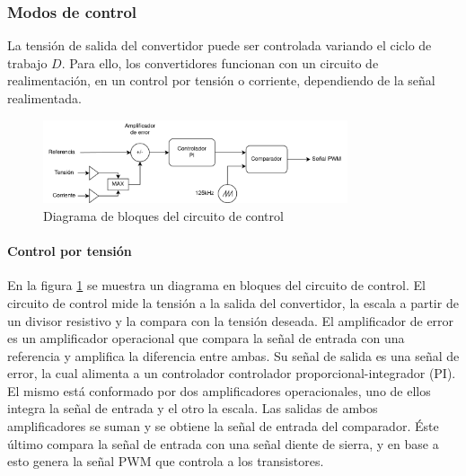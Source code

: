 
\subsubsection{Modos de control}

La tensión de salida del convertidor puede ser controlada variando el ciclo de trabajo $D$. 
Para ello, los convertidores funcionan con un circuito de realimentación,
en un control por tensión o corriente, dependiendo de la señal realimentada. 

\begin{figure}[ht]
    \centering
    \includegraphics[width=0.8\textwidth]{images/compensador.png}
    \caption{Diagrama de bloques del circuito de control}
    \label{fig:marco_teorico:control}
\end{figure}

\paragraph{Control por tensión}
En la figura \ref{fig:marco_teorico:control} se muestra un diagrama en bloques del circuito de control.
El circuito de control mide la tensión a la salida del convertidor, la escala a partir de un divisor resistivo y la compara con la tensión deseada.
El amplificador de error es un amplificador operacional que compara la señal de entrada con una referencia y
amplifica la diferencia entre ambas. Su señal de salida es una señal de error, la cual alimenta a un controlador controlador proporcional-integrador (PI).
El mismo está conformado por dos amplificadores operacionales, uno de ellos integra la señal de entrada y el otro la escala.
Las salidas de ambos amplificadores se suman y se obtiene la señal de entrada del comparador.
Éste último compara la señal de entrada con una señal diente de sierra, y en base a esto genera la señal PWM que controla a los transistores.

